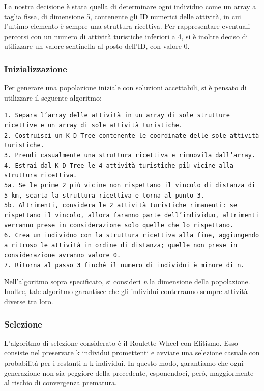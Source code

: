 \documentclass{CSUniSchoolLabReport}
\begin{document}
La nostra decisione è stata quella di determinare ogni individuo come un array a taglia fissa, di dimensione 5, contenente gli ID numerici delle attività, in cui l'ultimo elemento è sempre una struttura ricettiva. Per rappresentare eventuali percorsi con un numero di attività turistiche inferiori a 4, si è inoltre deciso di utilizzare un valore sentinella al posto dell'ID, con valore 0.

\subsubsection{Inizializzazione}

Per generare una popolazione iniziale con soluzioni accettabili, si è pensato di utilizzare il seguente algoritmo:

\texttt{1. Separa l'array delle attività in un array di sole strutture ricettive e un array di sole attività turistiche. \\
2. Costruisci un K-D Tree contenente le coordinate delle sole attività turistiche. \\
3. Prendi casualmente una struttura ricettiva e rimuovila dall'array. \\
4. Estrai dal K-D Tree le 4 attività turistiche più vicine alla struttura ricettiva. \\
5a. Se le prime 2 più vicine non rispettano il vincolo di distanza di 5 km, scarta la struttura ricettiva e torna al punto 3. \\
5b. Altrimenti, considera le 2 attività turistiche rimanenti: se rispettano il vincolo, allora faranno parte dell'individuo, altrimenti verranno prese in considerazione solo quelle che lo rispettano. \\
6. Crea un individuo con la struttura ricettiva alla fine, aggiungendo a ritroso le attività in ordine di distanza; quelle non prese in considerazione avranno valore 0. \\
7. Ritorna al passo 3 finché il numero di individui è minore di n. 
}

Nell'algoritmo sopra specificato, si consideri \textit{n} la dimensione della popolazione. \\
Inoltre, tale algoritmo garantisce che gli individui conterranno sempre attività diverse tra loro.

\subsubsection{Selezione}

L'algoritmo di selezione considerato è il Roulette Wheel con Elitismo. Esso consiste nel preservare k individui promettenti e avviare una selezione casuale con probabilità per i restanti n-k individui. In questo modo, garantiamo che ogni generazione non sia peggiore della precedente, esponendoci, però, maggiormente al rischio di convergenza prematura.
\end{document}

